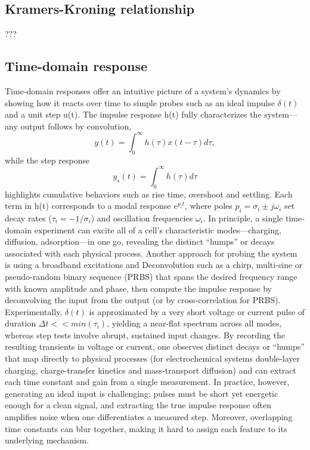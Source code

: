 \subsection{Kramers-Kroning relationship}
???

\subsection{Time-domain response}
Time‐domain responses offer an intuitive picture of a system’s dynamics by showing how it reacts over time to simple probes such as an ideal impulse $\delta(t)$ and a unit step u(t). The impulse response h(t) fully characterizes the system—any output follows by convolution,
$$
y(t)=\int _0 ^\infty h(\tau) x(t-\tau)d\tau,
$$
while the step response 
$$ 
y_s(t)=\int _0 ^\infty h(\tau)d\tau 
$$
highlights cumulative behaviors such as rise time, overshoot and settling. Each term in h(t) corresponds to a modal response $e^{p_i t}$, where poles $p_i=\sigma_i\pm j\omega_i$ set decay rates ($\tau_i=-1/\sigma_i$) and oscillation frequencies $\omega_i$.
In principle, a single time‐domain experiment can excite all of a cell’s characteristic modes—charging, diffusion, adsorption—in one go, revealing the distinct “humps” or decays associated with each physical process. Another approach for probing the system is using a broadband excitations and Deconvolution such as a chirp, multi-sine or pseudo-random binary sequence (PRBS) that spans the desired frequency range with known amplitude and phase, then compute the impulse response by deconvolving the input from the output (or by cross-correlation for PRBS).
Experimentally, $\delta(t)$ is approximated by a very short voltage or current pulse of duration $\Delta t << min(\tau_i)$, yielding a near-flat spectrum across all modes, whereas step tests involve abrupt, sustained input changes. By recording the resulting transients in voltage or current, one observes distinct decays or “humps” that map directly to physical processes (for electrochemical systems double-layer charging, charge-transfer kinetics and mass-transport diffusion) and can extract each time constant and gain from a single measurement. 
In practice, however, generating an ideal input is challenging: pulses must be short yet energetic enough for a clean signal, and extracting the true impulse response often amplifies noise when one differentiates a measured step. Moreover, overlapping time constants can blur together, making it hard to assign each feature to its underlying mechanism.

